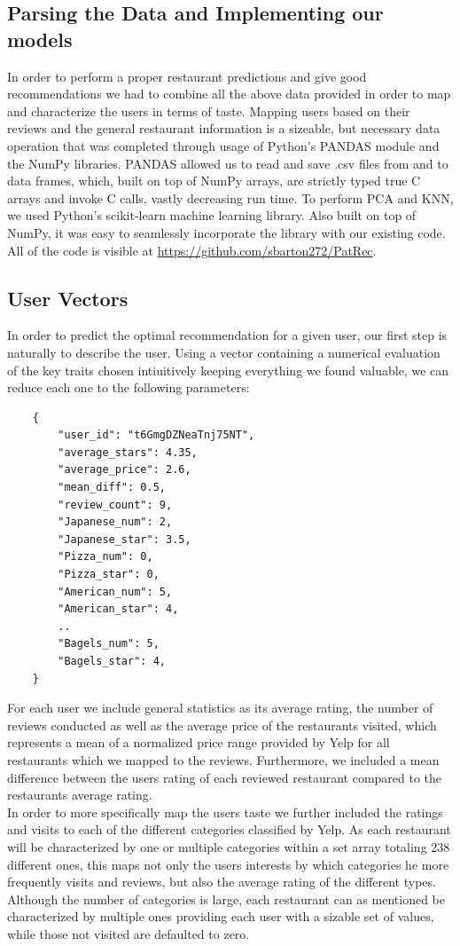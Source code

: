 \documentclass[10pt,twocolumn,letterpaper]{article}
\begin{document}
\subsection{Parsing the Data and Implementing our models}
In order to perform a proper restaurant predictions and give good recommendations we had to combine all the above data provided in order to map and characterize the users in terms of taste. Mapping users based on their reviews and the general restaurant information is a sizeable, but necessary data operation that was completed through usage of Python's PANDAS module and the NumPy libraries. PANDAS allowed us to read and save .csv files from and to data frames, which, built on top of NumPy arrays, are strictly typed true C arrays and invoke C calls, vastly decreasing run time. To perform PCA and KNN, we used Python's scikit-learn machine learning library. Also built on top of NumPy, it was easy to seamlessly incorporate the library with our existing code. All of the code is visible at \url{https://github.com/sbarton272/PatRec}.

\subsection{User Vectors}
In order to predict the optimal recommendation for a given user, our first step is naturally to describe the user. Using a vector containing a numerical evaluation of the key traits chosen intiuitively keeping everything we found valuable, we can reduce each one to the following parameters:
\begin{verbatim}
	{
	    "user_id": "t6GmgDZNeaTnj75NT",
	    "average_stars": 4.35,
	    "average_price": 2.6,
	   	"mean_diff": 0.5,
	   	"review_count": 9,
	   	"Japanese_num": 2,
	   	"Japanese_star": 3.5,
	   	"Pizza_num": 0,
	   	"Pizza_star": 0,
	   	"American_num": 5,
	   	"American_star": 4,
	   	..
	   	"Bagels_num": 5,
	   	"Bagels_star": 4,
	}
\end{verbatim}

For each user we include general statistics as its average rating, the number of reviews conducted as well as the average price of the restaurants visited, which represents a mean of a normalized price range provided by Yelp for all restaurants which we mapped to the reviews. Furthermore, we included a mean difference between the users rating of each reviewed restaurant compared to the restaurants average rating. 
\\[.5em]
\indent In order to more specifically map the users taste we further included the ratings and visits to each of the different categories classified by Yelp. As each restaurant will be characterized by one or multiple categories within a set array totaling 238 different ones, this maps not only the users interests by which categories he more frequently visits and reviews, but also the average rating of the different types. Although the number of categories is large, each restaurant can as mentioned be characterized by multiple ones providing each user with a sizable set of values, while those not visited are defaulted to zero.
\end{document}

